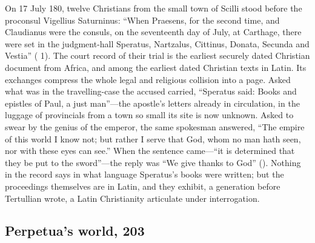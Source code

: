 On 17 July 180, twelve Christians from the small town of Scilli stood before
the proconsul Vigellius Saturninus: ``When Praesens, for the second time, and
Claudianus were the consuls, on the seventeenth day of July, at Carthage, there
were set in the judgment-hall Speratus, Nartzalus, Cittinus, Donata, Secunda
and Vestia'' ( 1). The court record of
their trial is the earliest securely dated Christian document from Africa, and
among the earliest dated Christian texts in Latin. Its exchanges compress the
whole legal and religious collision into a page. Asked what was in the
travelling-case the accused carried, ``Speratus said: Books and epistles of
Paul, a just man''---the apostle's letters already in circulation, in the
luggage of provincials from a town so small its site is now unknown. Asked to
swear by the genius of the emperor, the same spokesman answered, ``The empire
of this world I know not; but rather I serve that God, whom no man hath seen,
nor with these eyes can see.'' When the sentence came---``it is determined that
they be put to the sword''---the reply was ``We give thanks to God''
(). Nothing in the record says in what
language Speratus's books were written; but the proceedings themselves are in
Latin, and they exhibit, a generation before Tertullian wrote, a Latin
Christianity articulate under interrogation.

\subsection{Perpetua's world, 203}

